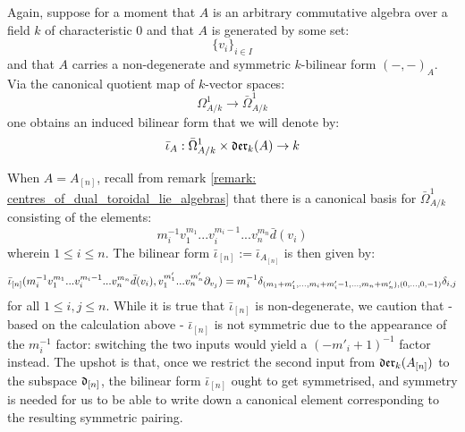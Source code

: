         \begin{remark} \label{remark: pairing_cyclic_1_forms_and_div_zero_vector_fields} 
            Again, suppose for a moment that $A$ is an arbitrary commutative algebra over a field $k$ of characteristic $0$ and that $A$ is generated by some set:
                $$\{v_i\}_{i \in I}$$
            and that $A$ carries a non-degenerate and symmetric $k$-bilinear form $(-, -)_A$. Via the canonical quotient map of $k$-vector spaces:
                $$\Omega^1_{A/k} \to \bar{\Omega}^1_{A/k}$$
            one obtains an induced bilinear form that we will denote by:
                $$\bar{\iota}_A: \bar{\Omega}^1_{A/k} \x \der_k(A) \to k$$

            When $A = A_{[n]}$, recall from remark \ref{remark: centres_of_dual_toroidal_lie_algebras} that there is a canonical basis for $\bar{\Omega}^1_{A/k}$ consisting of the elements:
                $$m_i^{-1} v_1^{m_1} ... v_i^{m_i - 1} ... v_n^{m_n} \bar{d}(v_i)$$
            wherein $1 \leq i \leq n$. The bilinear form $\bar{\iota}_{[n]} := \bar{\iota}_{A_{[n]}}$ is then given by:
                $$\bar{\iota}_{[n]}( m_i^{-1} v_1^{m_1} ... v_i^{m_i - 1} ... v_n^{m_n} \bar{d}(v_i), v_1^{m_1'} ... v_n^{m_n'} \partial_{v_j} ) = m_i^{-1} \delta_{(m_1 + m_1', ..., m_i + m_i' - 1, ..., m_n + m_n'), (0, ..., 0, -1)} \delta_{i, j}$$
            for all $1 \leq i, j \leq n$. While it is true that $\bar{\iota}_{[n]}$ is non-degenerate, we caution that - based on the calculation above - $\bar{\iota}_{[n]}$ is not symmetric due to the appearance of the $m_i^{-1}$ factor: switching the two inputs would yield a $(-m'_i + 1)^{-1}$ factor instead. The upshot is that, once we restrict the second input from $\mathfrak{der}_k(A_{[n]})$ to the  subspace $\mathfrak{d}_{[n]}$, the bilinear form $\bar{\iota}_{[n]}$ ought to get symmetrised, and symmetry is needed for us to be able to write down a canonical element corresponding to the resulting symmetric pairing.


\end{remark}
